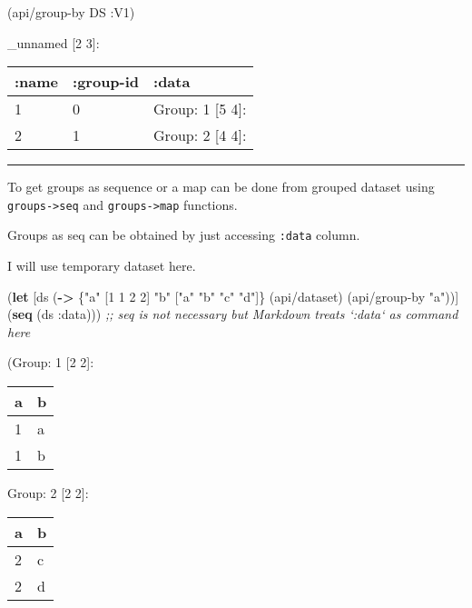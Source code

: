 \documentclass[]{article}
\newenvironment{Shaded}{\begin{snugshade}}{\end{snugshade}}
\newcommand{\KeywordTok}[1]{\textcolor[rgb]{0.13,0.29,0.53}{\textbf{#1}}}
\newcommand{\DecValTok}[1]{\textcolor[rgb]{0.00,0.00,0.81}{#1}}
\newcommand{\StringTok}[1]{\textcolor[rgb]{0.31,0.60,0.02}{#1}}
\newcommand{\CommentTok}[1]{\textcolor[rgb]{0.56,0.35,0.01}{\textit{#1}}}
\newcommand{\AttributeTok}[1]{\textcolor[rgb]{0.77,0.63,0.00}{#1}}
\newcommand{\NormalTok}[1]{#1}
\begin{document}
\begin{Shaded}
\begin{Highlighting}[]
\NormalTok{(api/group-by DS }\AttributeTok{:V1}\NormalTok{)}
\end{Highlighting}
\end{Shaded}

\_unnamed {[}2 3{]}:

\begin{longtable}[]{@{}lll@{}}
\toprule
:name & :group-id & :data\tabularnewline
\midrule
\endhead
1 & 0 & Group: 1 {[}5 4{]}:\tabularnewline
2 & 1 & Group: 2 {[}4 4{]}:\tabularnewline
\bottomrule
\end{longtable}

\begin{center}\rule{0.5\linewidth}{0.5pt}\end{center}

To get groups as sequence or a map can be done from grouped dataset
using \texttt{groups-\textgreater{}seq} and
\texttt{groups-\textgreater{}map} functions.

Groups as seq can be obtained by just accessing \texttt{:data} column.

I will use temporary dataset here.

\begin{Shaded}
\begin{Highlighting}[]
\NormalTok{(}\KeywordTok{let}\NormalTok{ [ds (}\KeywordTok{->}\NormalTok{ \{}\StringTok{"a"}\NormalTok{ [}\DecValTok{1} \DecValTok{1} \DecValTok{2} \DecValTok{2}\NormalTok{]}
              \StringTok{"b"}\NormalTok{ [}\StringTok{"a"} \StringTok{"b"} \StringTok{"c"} \StringTok{"d"}\NormalTok{]\}}
\NormalTok{             (api/dataset)}
\NormalTok{             (api/group-by }\StringTok{"a"}\NormalTok{))]}
\NormalTok{  (}\KeywordTok{seq}\NormalTok{ (ds }\AttributeTok{:data}\NormalTok{))) }\CommentTok{;; seq is not necessary but Markdown treats `:data` as command here}
\end{Highlighting}
\end{Shaded}

(Group: 1 {[}2 2{]}:

\begin{longtable}[]{@{}ll@{}}
\toprule
a & b\tabularnewline
\midrule
\endhead
1 & a\tabularnewline
1 & b\tabularnewline
\bottomrule
\end{longtable}

Group: 2 {[}2 2{]}:

\begin{longtable}[]{@{}ll@{}}
\toprule
a & b\tabularnewline
\midrule
\endhead
2 & c\tabularnewline
2 & d\tabularnewline
\bottomrule
\end{longtable}
\end{document}
